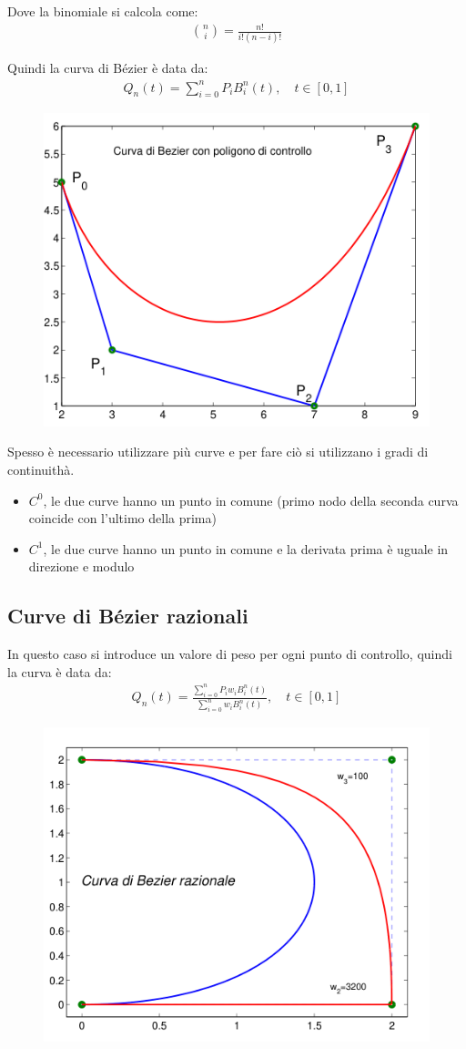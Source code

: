 Dove la binomiale si calcola come:
\begin{align}
  \binom{n}{i} = \frac{n!}{i!(n-i)!}
\end{align}


Quindi la curva di B\'ezier \`e data da:
\begin{align}
  Q_n(t) = \sum_{i=0}^n P_i B_i^n(t), \quad t \in [0, 1]
\end{align}

\begin{figure}[h!]
  \centering
  \includegraphics[width=0.4\linewidth]{images/curva_bazier_esempio.png}
\end{figure}



Spesso \`e necessario utilizzare pi\`u curve e per fare ci\`o si utilizzano i gradi di continuith\`a.

\begin{itemize}
  \item $C^0$, le due curve hanno un punto in comune (primo nodo della seconda curva coincide con l'ultimo della prima)
  \item $C^1$, le due curve hanno un punto in comune e la derivata prima \`e uguale in direzione e modulo
\end{itemize}

\subsection{Curve di B\'ezier razionali}

In questo caso si introduce un valore di peso per ogni punto di controllo, quindi la curva \`e data da:
\begin{align}
  Q_n(t) = \frac{\sum_{i=0}^n P_i w_i B_i^n(t)}{\sum_{i=0}^n w_i B_i^n(t)}, \quad t \in [0, 1]
\end{align}


\begin{figure}[h!]
  \centering
  \includegraphics[width=0.4\linewidth]{images/bazier_pesato_esempio.png}
\end{figure}



